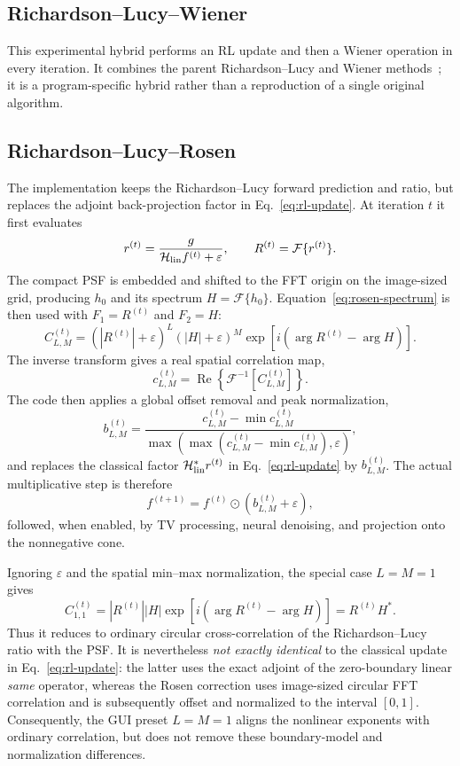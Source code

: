 \documentclass[10pt,a4paper]{article}
\newcommand{\calF}{\mathcal{F}}
\begin{document}
\subsection{Richardson--Lucy--Wiener}
This experimental hybrid performs an RL update and then a Wiener operation in every iteration. It combines the parent Richardson--Lucy and Wiener methods~\cite{Richardson1972,Lucy1974,Wiener1949}; it is a program-specific hybrid rather than a reproduction of a single original algorithm.

\subsection{Richardson--Lucy--Rosen}
The implementation keeps the Richardson--Lucy forward prediction and ratio, but replaces the adjoint back-projection factor in Eq.~\eqref{eq:rl-update}. At iteration $t$ it first evaluates
\[
r^{(t)}=\frac{g}{\mathcal H_{\rm lin}f^{(t)}+\varepsilon},
\qquad R^{(t)}=\calF\{r^{(t)}\}.
\]
The compact PSF is embedded and shifted to the FFT origin on the image-sized grid, producing $h_0$ and its spectrum $H=\calF\{h_0\}$. Equation~\eqref{eq:rosen-spectrum} is then used with $F_1=R^{(t)}$ and $F_2=H$:
\begin{equation}
\label{eq:rosen-spectrum}
C_{L,M}^{(t)}=(|R^{(t)}|+\varepsilon)^L(|H|+\varepsilon)^M
\exp\!\left[i\left(\arg R^{(t)}-\arg H\right)\right].
\end{equation}
The inverse transform gives a real spatial correlation map,
\[
c_{L,M}^{(t)}=\operatorname{Re}\!\left\{\calF^{-1}\!\left[C_{L,M}^{(t)}\right]\right\}.
\]
The code then applies a global offset removal and peak normalization,
\[
b_{L,M}^{(t)}=
\frac{c_{L,M}^{(t)}-\min c_{L,M}^{(t)}}
{\max\!\left(\max(c_{L,M}^{(t)}-\min c_{L,M}^{(t)}),\varepsilon\right)},
\]
and replaces the classical factor $\mathcal H_{\rm lin}^{*}r^{(t)}$ in Eq.~\eqref{eq:rl-update} by $b_{L,M}^{(t)}$. The actual multiplicative step is therefore
\[
f^{(t+1)}=f^{(t)}\odot\left(b_{L,M}^{(t)}+\varepsilon\right),
\]
followed, when enabled, by TV processing, neural denoising, and projection onto the nonnegative cone.

Ignoring $\varepsilon$ and the spatial min--max normalization, the special case $L=M=1$ gives
\[
C_{1,1}^{(t)}=|R^{(t)}||H|
\exp\!\left[i(\arg R^{(t)}-\arg H)\right]
=R^{(t)}H^{*}.
\]
Thus it reduces to ordinary circular cross-correlation of the Richardson--Lucy ratio with the PSF. It is nevertheless \emph{not exactly identical} to the classical update in Eq.~\eqref{eq:rl-update}: the latter uses the exact adjoint of the zero-boundary linear \emph{same} operator, whereas the Rosen correction uses image-sized circular FFT correlation and is subsequently offset and normalized to the interval $[0,1]$. Consequently, the GUI preset $L=M=1$ aligns the nonlinear exponents with ordinary correlation, but does not remove these boundary-model and normalization differences.
\end{document}
